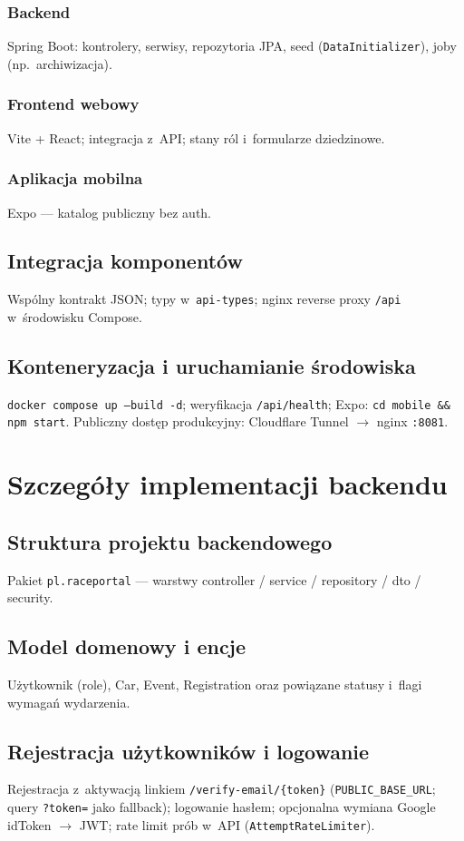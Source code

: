 \documentclass{sprz}
\begin{document}
\subsection{Backend}  
Spring Boot: kontrolery, serwisy, repozytoria JPA, seed (\texttt{DataInitializer}), joby (np.\ archiwizacja).  
\subsection{Frontend webowy}  
Vite + React; integracja z~API; stany ról i~formularze dziedzinowe.  
\subsection{Aplikacja mobilna}  
Expo --- katalog publiczny bez auth.  
\section{Integracja komponentów}  
Wspólny kontrakt JSON; typy w~\texttt{api-types}; nginx reverse proxy \texttt{/api} w~środowisku Compose.  
\section{Konteneryzacja i uruchamianie środowiska}  
\texttt{docker compose up --build -d}; weryfikacja \texttt{/api/health}; Expo: \texttt{cd mobile \&\& npm start}. Publiczny dostęp produkcyjny: Cloudflare Tunnel $\rightarrow$ nginx \texttt{:8081}.  
  
\chapter{Szczegóły implementacji backendu}  
\label{ch:backend}  
\section{Struktura projektu backendowego}  
Pakiet \texttt{pl.raceportal} --- warstwy controller / service / repository / dto / security.  
\section{Model domenowy i encje}  
Użytkownik (role), Car, Event, Registration oraz powiązane statusy i~flagi wymagań wydarzenia.  
\section{Rejestracja użytkowników i logowanie}  
Rejestracja z~aktywacją linkiem \texttt{/verify-email/\{token\}} (\texttt{PUBLIC\_BASE\_URL}; query \texttt{?token=} jako fallback); logowanie hasłem; opcjonalna wymiana Google idToken $\rightarrow$ JWT; rate limit prób w~API (\texttt{AttemptRateLimiter}).  
\end{document}
